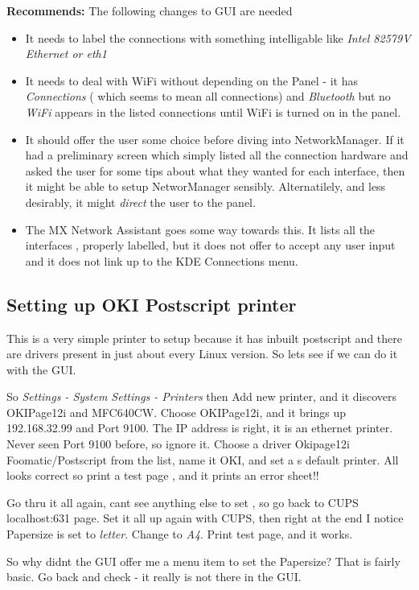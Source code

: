 \documentclass{article}  %
\begin{document}
{\bf Recommends:} The following changes to GUI are needed
\begin{itemize}
\item   It needs to label the connections with something intelligable like {\em Intel 82579V Ethernet or eth1}
\item It needs to deal with WiFi without depending on the Panel - it has {\em Connections} ( which seems to mean all connections) and {\em Bluetooth}  but no {\em WiFi}  appears in the listed connections until WiFi is turned on in the panel.
\item It should offer the user some choice before diving into NetworkManager. If it had a preliminary screen which simply listed all the connection hardware and asked the user for some tips about what they wanted for each interface, then it might be able to setup NetworManager sensibly. Alternatilely, and less desirably, it might {\em direct} the user to the panel.
\item The MX Network Assistant goes some way towards this. It lists all the interfaces , properly labelled, but it does not offer to accept any user input and it does not link up to  the KDE Connections menu.
\end{itemize}

\subsection{Setting up OKI Postscript printer}
This is a very simple printer to setup because it has inbuilt postscript and there are drivers present in just about every Linux version. So lets see if we can do it with the GUI.

So {\em Settings - System Settings - Printers} then
Add new printer, and it discovers OKIPage12i and MFC640CW. Choose OKIPage12i, and it brings up 192.168.32.99 and Port 9100. The IP address is right, it is an ethernet printer. Never seen Port 9100 before, so ignore it. Choose a driver Okipage12i Foomatic/Postscript from the list, name it OKI, and set a s default printer. All looks correct so print a test page , and it prints an error sheet!!

Go thru it all again, cant see anything else to set , so go back to CUPS localhost:631 page. Set it all up again with CUPS, then right at the end I notice Papersize is set to {\em letter}. Change to {\em A4}. Print test page, and it works.

So why didnt the GUI offer me a menu item to set the Papersize? That is fairly basic.  Go back and check - it really is not there in the GUI.
\end{document}

